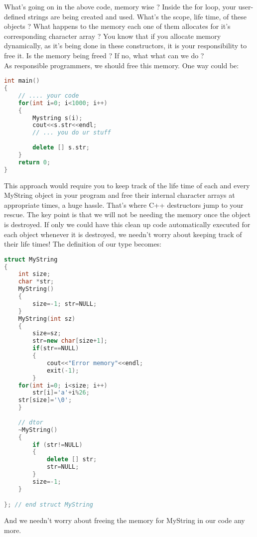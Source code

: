 \documentclass[11pt,fleqn]{book} %
\begin{document}
What's going on in the above code, memory wise ? Inside the for loop, your user-defined strings are being created and used. What's the scope, life time, of these objects ? What happens to the memory each one of them allocates for it's corresponding character array ? You know that if you allocate memory dynamically, as it's being done in these constructors, it is your responsibility to free it. Is the memory being freed ? If no, what what can we do ? \smallskip
~\\
\noindent As responsible programmers, we should free this memory. One way could be:
\begin{lstlisting}[language=C++, caption = Free memory in main()]
int main() 
{
	// .... your code
	for(int i=0; i<1000; i++)
	{
		Mystring s(i);
		cout<<s.str<<endl;
		// ... you do ur stuff
		
		delete [] s.str;
	}
	return 0;
}

\end{lstlisting}

\noindent This approach would require you to keep track of the life time of each and every MyString object in your program and free their internal character arrays at appropriate times, a huge hassle. That's where C++ destructors jump to your rescue. The key point is that we will not be needing the memory once the object is destroyed. If only we could have this clean up code automatically executed for each object whenever it is destroyed, we needn't worry about keeping track of their life times! The definition of our type becomes:
\begin{lstlisting}[language=C++, caption = Destructor]
struct MyString 
{
	int size;
	char *str;
	MyString()
	{
		size=-1; str=NULL;
	} 
	MyString(int sz)
	{
		size=sz;
		str=new char[size+1];
		if(str==NULL)
		{
			cout<<"Error memory"<<endl;
			exit(-1);
		} 
	for(int i=0; i<size; i++)
		str[i]='a'+i%26;
	str[size]='\0';
	}
	
	// dtor
	~MyString()
	{
		if (str!=NULL)
		{
			delete [] str;
			str=NULL;
		} 
		size=-1; 
	}

}; // end struct MyString
\end{lstlisting}

And we needn't worry about freeing the memory for MyString in our code any more.
\end{document}
